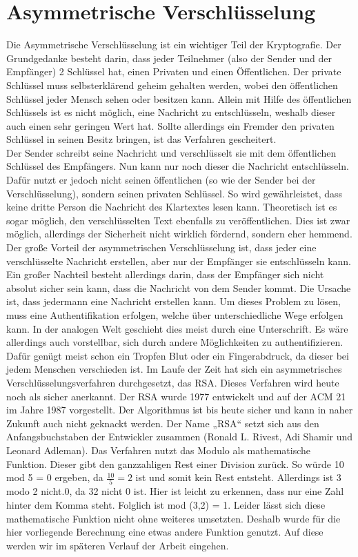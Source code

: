 \section{Asymmetrische Verschlüsselung}
Die Asymmetrische Verschlüsselung ist ein wichtiger Teil der Kryptografie. Der Grundgedanke besteht darin, dass jeder Teilnehmer (also der Sender und der Empfänger) 2 Schlüssel hat, einen Privaten und einen Öffentlichen. Der private Schlüssel muss selbsterklärend geheim gehalten werden, wobei den öffentlichen Schlüssel jeder Mensch sehen oder besitzen kann. Allein mit Hilfe des öffentlichen Schlüssels ist es nicht möglich, eine Nachricht zu entschlüsseln, weshalb dieser auch einen sehr geringen Wert hat. Sollte allerdings ein Fremder den privaten Schlüssel in seinen Besitz bringen, ist das Verfahren gescheitert.   \\
Der Sender schreibt seine Nachricht und verschlüsselt sie mit dem öffentlichen Schlüssel des Empfängers. Nun kann nur noch dieser die Nachricht entschlüsseln. Dafür nutzt er jedoch nicht seinen öffentlichen (so wie der Sender bei der Verschlüsselung), sondern seinen privaten Schlüssel. So wird gewährleistet, dass keine dritte Person die Nachricht des Klartextes lesen kann. Theoretisch ist es sogar möglich, den verschlüsselten Text ebenfalls zu veröffentlichen. Dies ist zwar möglich, allerdings der Sicherheit nicht wirklich fördernd, sondern eher hemmend.\\

Der große Vorteil der asymmetrischen Verschlüsselung ist, dass jeder eine verschlüsselte Nachricht erstellen, aber nur der Empfänger sie entschlüsseln kann. Ein großer Nachteil besteht allerdings darin, dass der Empfänger sich nicht absolut sicher sein kann, dass die Nachricht von dem Sender kommt. Die Ursache ist, dass jedermann eine Nachricht erstellen kann. Um dieses Problem zu lösen, muss eine Authentifikation erfolgen, welche über unterschiedliche Wege erfolgen kann. In der analogen Welt geschieht dies meist durch eine Unterschrift. Es wäre allerdings auch vorstellbar, sich durch andere Möglichkeiten zu authentifizieren. Dafür genügt meist schon ein Tropfen Blut oder ein Fingerabdruck, da dieser bei jedem Menschen verschieden ist. Im Laufe der Zeit hat sich ein asymmetrisches Verschlüsselungsverfahren durchgesetzt, das RSA. Dieses Verfahren wird heute noch als sicher anerkannt. Der RSA wurde 1977 entwickelt und auf der ACM 21 im Jahre 1987 vorgestellt. Der Algorithmus ist bis heute sicher und kann in naher Zukunft auch nicht geknackt werden. Der Name „RSA“ setzt sich aus den Anfangsbuchstaben der Entwickler zusammen (Ronald L. Rivest, Adi Shamir und Leonard Adleman). Das Verfahren nutzt das Modulo als mathematische Funktion. Dieser gibt den ganzzahligen Rest einer Division zurück. So würde 10 mod 5 = 0 ergeben, da $\frac{10}{5} = 2$ ist und somit kein Rest entsteht. Allerdings ist 3 modo 2 nicht.0, da 32 nicht 0 ist. Hier ist leicht zu erkennen, dass nur eine Zahl hinter dem Komma steht. Folglich ist mod (3,2) = 1. Leider lässt sich diese mathematische Funktion nicht ohne weiteres umsetzten. Deshalb wurde für die hier vorliegende Berechnung eine etwas andere Funktion genutzt. Auf diese werden wir im späteren Verlauf der Arbeit eingehen. \\

